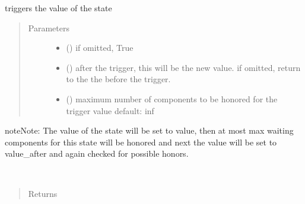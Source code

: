 \documentclass[letterpaper,10pt,english]{sphinxmanual}
\begin{document}
\begin{fulllineitems}
\begin{fulllineitems}
\label{\detokenize{Reference:salabim.State.trigger}}
triggers the value of the state
\begin{quote}\begin{description}
\item[{Parameters}] \leavevmode\begin{itemize}
\item {} 
 (\sphinxstyleliteralemphasis{\sphinxupquote{ (}}\sphinxstyleliteralemphasis{\sphinxupquote{)}}) \textendash{} if omitted, True 

\item {} 
 (\sphinxstyleliteralemphasis{\sphinxupquote{ (}}\sphinxstyleliteralemphasis{\sphinxupquote{)}}) \textendash{} after the trigger, this will be the new value. 
if omitted, return to the the before the trigger.

\item {} 
 () \textendash{} maximum number of components to be honored for the trigger value 
default: inf

\end{itemize}

\end{description}\end{quote}

\begin{sphinxadmonition}{note}{Note:}
The value of the state will be set to value, then at most
max waiting components for this state  will be honored and next
the value will be set to value\_after and again checked for possible
honors.
\end{sphinxadmonition}

\end{fulllineitems}


\begin{fulllineitems}
\label{\detokenize{Reference:salabim.State.waiters}}~\begin{quote}\begin{description}
\item[{Returns}] \leavevmode
{}


\end{description}
\end{quote}
\end{fulllineitems}
\end{fulllineitems}
\end{document}
